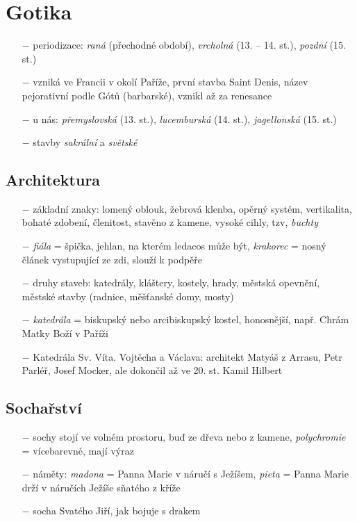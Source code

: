 \documentclass{article}
\begin{document}
\section*{Gotika}
\begin{itemize}
    \vspace{-0.5em}
    \setlength\itemsep{0.15em}
    \item[$-$] periodizace: \textit{raná} (přechodné období), \textit{vrcholná} (13. -- 14. st.), \textit{pozdní} (15. st.)
    \item[$-$] vzniká ve Francii v okolí Paříže, první stavba Saint Denis, název pejorativní podle Gótů (barbarské), vznikl až za renesance
    \item[$-$] u nás: \textit{přemyslovská} (13. st.), \textit{lucemburská} (14. st.), \textit{jagellonská} (15. st.)
    \item[$-$] stavby \textit{sakrální} a \textit{světské}
\end{itemize}

\subsection*{Architektura}
\begin{itemize}
    \vspace{-0.5em}
    \setlength\itemsep{0.15em}
    \item[$-$] základní znaky: lomený oblouk, žebrová klenba, opěrný systém, vertikalita, bohaté zdobení, členitost, stavěno z kamene, vysoké cihly, tzv, \textit{buchty}
    \item[$-$] \textit{fiála} = špička, jehlan, na kterém ledacos může být, \textit{krakorec} = nosný článek vystupující ze zdi, slouží k podpěře
    \item[$-$] druhy staveb: katedrály, kláštery, kostely, hrady, městská opevnění, městské stavby (radnice, měšťanské domy, mosty)
    \item[$-$] \textit{katedrála} = biskupský nebo arcibiskupský kostel, honosnější, např. Chrám Matky Boží v Paříži
    \item[$-$] Katedrála Sv. Víta. Vojtěcha a Václava: architekt Matyáš z Arrasu, Petr Parléř, Josef Mocker, ale dokončil až ve 20. st. Kamil Hilbert
\end{itemize}

\subsection*{Sochařství}
\begin{itemize}
    \vspace{-0.5em}
    \setlength\itemsep{0.15em}
    \item[$-$] sochy stojí ve volném prostoru, buď ze dřeva nebo z kamene, \textit{polychromie}  = vícebarevné, mají výraz
    \item[$-$] náměty: \textit{madona} = Panna Marie v náručí s Ježíšem, \textit{pieta} =
Panna Marie drží v náručích Ježíše sňatého z kříže
    \item[$-$] socha Svatého Jiří, jak bojuje s drakem

\end{itemize}
\end{document}
